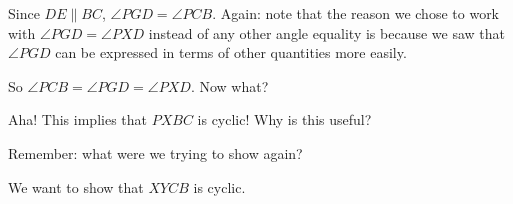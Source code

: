 




Since $DE\parallel BC$, $\angle PGD = \angle PCB$. Again: note that the reason we chose to work with $\angle PGD = \angle PXD$ instead of any other angle equality is because we saw that $\angle PGD$ can be expressed in terms of other quantities more easily.


So $\angle PCB = \angle PGD = \angle PXD$. Now what?





Aha! This implies that $PXBC$ is cyclic! Why is this useful?

Remember: what were we trying to show again?


We want to show that $XYCB$ is cyclic.



